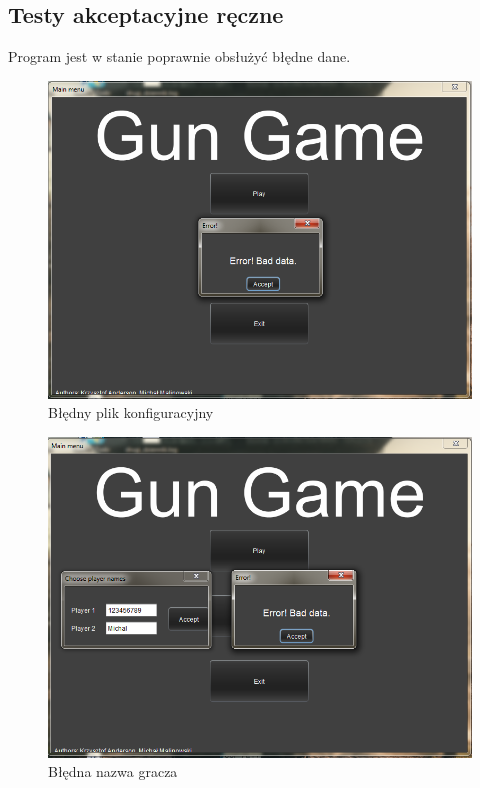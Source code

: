 \documentclass[12pt]{report}
\begin{document}
\subsection{Testy akceptacyjne ręczne}
Program jest w stanie poprawnie obsłużyć błędne dane.
    \begin{figure}[H]
    \centering
    \includegraphics[width=14cm]{obrazy/configBadData.png}
    \caption{Błędny plik konfiguracyjny}
    \label{config bad data}
    \end{figure}
    \begin{figure}[H]
    \centering
    \includegraphics[width=14cm]{obrazy/nameBadData.png}
    \caption{Błędna nazwa gracza}
    \label{bad player name}
    \end{figure}
\end{document}
